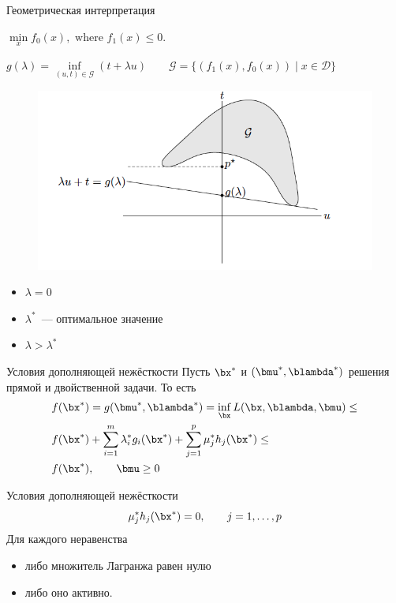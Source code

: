 \documentclass[12pt,russian]{beamer}
\begin{document}
\begin{frame}{Геометрическая интерпретация}
\begin{center}
$\min\limits_{x} f_0(x), \text{ where } f_1(x) \leq 0.$
\end{center}
$
g(\lambda) = \inf\limits_{(u, t) \in \mathcal{G}} (t + \lambda u) \qquad \mathcal{G} = \{ (f_1(x), f_0(x)) \; | \; x \in \mathcal{D} \}
$

\begin{figure}
\centering
\includegraphics[scale=0.3]{dual_geometry.png}
\end{figure}
\begin{itemize}
\item $\lambda = 0$
\item $\lambda^*$~--- оптимальное значение
\item $\lambda > \lambda^*$
\end{itemize}
\end{frame}

\begin{frame}{Условия дополняющей нежёсткости}
Пусть $\bx^*$ и $(\bmu^*, \blambda^*)$ решения прямой и двойственной задачи. То есть
\begin{equation*}
\begin{split}
& f(\bx^*) = g(\bmu^*, \blambda^*) = \inf\limits_{\bx} L(\bx, \blambda, \bmu) \leq \\
& f(\bx^*) + \sum\limits_{i=1}^m\lambda^*_i g_i(\bx^*) + \sum\limits_{j=1}^p \mu^*_j h_j(\bx^*) \leq\\
& f(\bx^*), \qquad \bmu \geq 0 
\end{split}
\end{equation*}

\begin{block}{Условия дополняющей нежёсткости}
\[
\mu^*_j h_j(\bx^*) = 0, \qquad j = 1,\ldots,p 
\]
Для каждого неравенства
\begin{itemize}
\item либо множитель Лагранжа равен нулю
\item либо оно активно.
\end{itemize} 
\end{block}
\end{frame}
\end{document}

